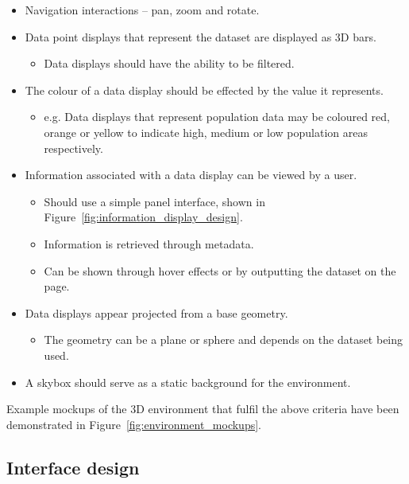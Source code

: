 {{		\begin{itemize}
			\item Navigation interactions -- pan, zoom and rotate.
			\item Data point displays that represent the dataset are displayed as 3D bars.
				\begin{itemize}
					\item Data displays should have the ability to be filtered.
				\end{itemize}
			\item The colour of a data display should be effected by the value it represents.
				\begin{itemize}
					\item e.g. Data displays that represent population data may be coloured red, orange or yellow to indicate high, medium or low population areas respectively.
				\end{itemize}
			\item Information associated with a data display can be viewed by a user.
				\begin{itemize}
					\item Should use a simple panel interface, shown in Figure~\ref{fig:information_display_design}.
					\item Information is retrieved through metadata. 
					\item Can be shown through hover effects or by outputting the dataset on the page.
				\end{itemize}
			\item Data displays appear projected from a base geometry.
				\begin{itemize}
					\item The geometry can be a plane or sphere and depends on the dataset being used.
				\end{itemize}
			\item A skybox should serve as a static background for the environment.
		\end{itemize}

		

		Example mockups of the 3D environment that fulfil the above criteria have been demonstrated in Figure~\ref{fig:environment_mockups}.

		

	}

	\subsection{Interface design} {
	\label{sec:interface_design}

}}
